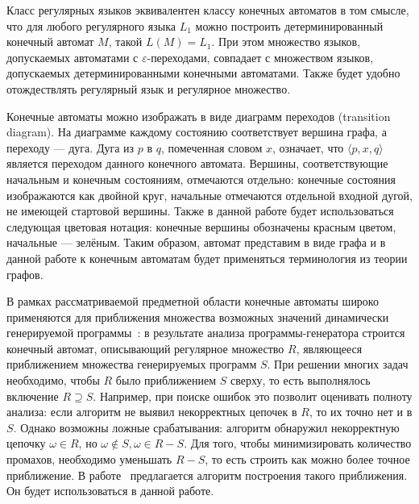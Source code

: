 Класс регулярных языков эквивалентен классу конечных автоматов в том смысле, что для любого регулярного языка $L_1$ можно построить детерминированный конечный автомат $M$, такой $ L(M)=L_1 $. При этом множество языков, допускаемых автоматами с $\varepsilon$-переходами, совпадает с множеством языков, допускаемых детерминированными конечными автоматами. Также будет удобно отождествлять регулярный язык и регулярное множество.

Конечные автоматы можно изображать в виде диаграмм переходов (transition diagram). На диаграмме каждому состоянию соответствует вершина графа, а переходу --- дуга. Дуга из $p$ в $q$, помеченная словом $x$, означает, что $\langle p , x , q \rangle$ является переходом данного конечного автомата. Вершины, соответствующие начальным и конечным состояниям, отмечаются отдельно: конечные состояния изображаются как двойной круг, начальные отмечаются отдельной входной дугой, не имеющей стартовой вершины. Также в данной работе будет использоваться следующая цветовая нотация: конечные вершины обозначены красным цветом, начальные --- зелёным.  Таким образом, автомат представим в виде графа и в данной работе к конечным автоматам будет применяться терминология из теории графов.

В рамках рассматриваемой предметной области конечные автоматы широко применяются для приближения множества возможных значений динамически генерируемой программы~\cite{Alvor1, JSA, RegOverApprox}: в результате анализа программы-генератора строится конечный автомат, описывающий регулярное множество $R$, являющееся приближением множества генерируемых программ $S$. При решении многих задач необходимо, чтобы $R$ было приближением $S$ сверху, то есть выполнялось включение $R \supseteq S$. Например, при поиске ошибок это позволит оценивать полноту анализа: если алгоритм не выявил некорректных цепочек в $R$, то их точно нет и в $S$. Однако возможны ложные срабатывания: алгоритм обнаружил некорректную цепочку $\omega \in R$, но $\omega \not\in S, \omega \in R-S$. Для того, чтобы минимизировать количество промахов, необходимо уменьшать $R-S$, то есть строить как можно более точное приближение. В работе~\cite{RegOverApprox} предлагается алгоритм построения такого приближения. Он будет использоваться в данной работе.

